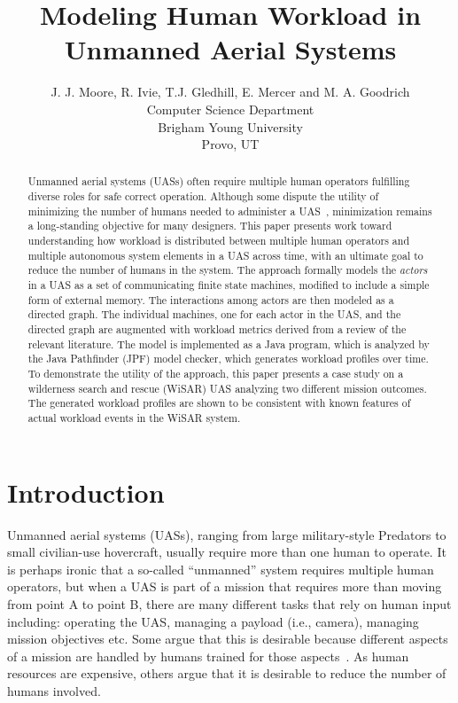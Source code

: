 \documentclass[letterpaper]{article}
\begin{document}
%
\title{Modeling Human Workload in Unmanned Aerial Systems}
\author{J. J. Moore, R. Ivie, T.J. Gledhill, E. Mercer and M. A. Goodrich\\
Computer Science Department \\ Brigham Young University \\ Provo, UT\\
}
\maketitle
\begin{abstract}
Unmanned aerial systems (UASs) often require multiple human operators fulfilling diverse roles for safe correct operation.  Although some dispute the utility of minimizing the number of humans needed to administer a UAS~\cite{MurphyBurke2010}, minimization remains a long-standing objective for many designers.  This paper presents work toward understanding how workload is distributed between multiple human operators and multiple autonomous system elements in a UAS across time, with an ultimate goal to reduce the number of humans in the system. The approach formally models the {\em actors} in a UAS as a set of communicating finite state machines, modified to include a simple form of external memory. The interactions among actors are then modeled as a directed graph.  The individual machines, one for each actor in the UAS, and the directed graph are augmented with workload metrics derived from a review of the relevant literature. The model is implemented as a Java program, which is analyzed by the Java Pathfinder (JPF) model checker, which generates workload profiles over time.  To demonstrate the utility of the approach, this paper presents a case study on a wilderness search and rescue (WiSAR) UAS analyzing two different mission outcomes. The generated workload profiles are shown to be consistent with known features of actual workload events in the WiSAR system. 
\end{abstract}

\noindent
\section{Introduction}

Unmanned aerial systems (UASs), ranging from large military-style Predators to small civilian-use hovercraft, usually require more than one human to operate.  It is perhaps ironic that a so-called ``unmanned'' system requires multiple human operators, but when a UAS is part of a mission that requires more than moving from point A to point B, there are many different tasks that rely on human input including: operating the UAS, managing a payload (i.e., camera), managing mission objectives etc.  Some argue that this is desirable because different aspects of a mission are handled by humans trained for those aspects~\cite{MurphyBurke2010}. As human resources are expensive, others argue that it is desirable to reduce the number of humans involved.
\end{document}
